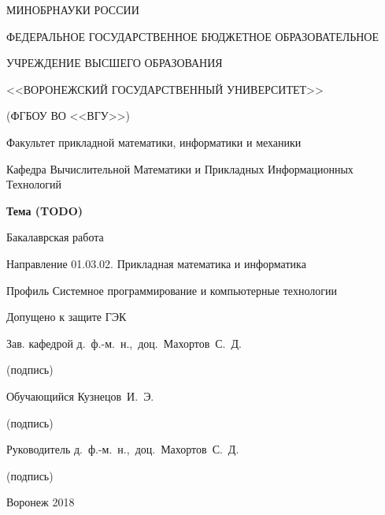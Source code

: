 \thispagestyle{empty}

\begin{center}
{\small
МИНОБРНАУКИ РОССИИ\par
ФЕДЕРАЛЬНОЕ ГОСУДАРСТВЕННОЕ БЮДЖЕТНОЕ ОБРАЗОВАТЕЛЬНОЕ\par
УЧРЕЖДЕНИЕ ВЫСШЕГО ОБРАЗОВАНИЯ\par
<<ВОРОНЕЖСКИЙ ГОСУДАРСТВЕННЫЙ УНИВЕРСИТЕТ>>\par
(ФГБОУ ВО <<ВГУ>>)\par
\vspace{4mm}}

Факультет прикладной математики, информатики и механики\par
\vspace{5mm}
Кафедра Вычислительной Математики и Прикладных Информационных Технологий\par
\vspace{35mm}

\textbf{Тема (TODO)}\par
\vspace{8mm}

Бакалаврская работа\par
Направление 01.03.02. Прикладная математика и информатика\par
Профиль Системное программирование и компьютерные технологии\par
\end{center}
\vspace{35mm}

Допущено к защите ГЭК \underline{\qquad\qquad\qquad}\par
\vspace{8mm}
Зав. кафедрой \underline{\qquad\qquad\qquad} \qquad\qquad\qquad д.~ф.-м.~н.,~доц.~Махортов~С.~Д.\par
\qquad\qquad\qquad\qquad(подпись)\par
\vspace{2mm}
Обучающийся \underline{\qquad\qquad\qquad} \qquad\qquad\qquad Кузнецов~И.~Э.\par
\qquad\qquad\qquad\qquad(подпись)\par
\vspace{2mm}
Руководитель \underline{\qquad\qquad\qquad} \qquad\qquad\qquad д.~ф.-м.~н.,~доц.~Махортов~С.~Д.\par
\qquad\qquad\qquad\qquad(подпись)\par
\vspace{11mm}

\begin{center}
Воронеж 2018
\end{center}
